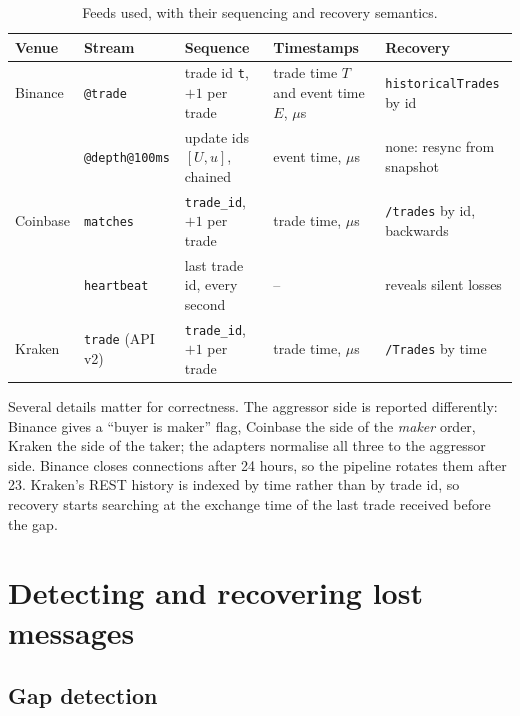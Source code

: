 \documentclass[11pt,a4paper]{article}
\newcommand{\code}[1]{\texttt{#1}}
\begin{document}
\begin{table}[ht]
\centering
\caption{Feeds used, with their sequencing and recovery semantics.}
\label{tab:venues}
\small
\begin{tabular}{@{}>{\raggedright\arraybackslash}p{1.5cm}>{\raggedright\arraybackslash}p{2.6cm}>{\raggedright\arraybackslash}p{3.3cm}>{\raggedright\arraybackslash}p{3.2cm}>{\raggedright\arraybackslash}p{3.0cm}@{}}
\toprule
Venue & Stream & Sequence & Timestamps & Recovery \\
\midrule
Binance & \code{@trade} & trade id \code{t}, $+1$ per trade & trade time $T$ and event time $E$, $\mu$s & \code{historicalTrades} by id \\
        & \code{@depth@100ms} & update ids $[U,u]$, chained & event time, $\mu$s & none: resync from snapshot \\
Coinbase & \code{matches} & \code{trade\_id}, $+1$ per trade & trade time, $\mu$s & \code{/trades} by id, backwards \\
         & \code{heartbeat} & last trade id, every second & -- & reveals silent losses \\
Kraken & \code{trade} (API v2) & \code{trade\_id}, $+1$ per trade & trade time, $\mu$s & \code{/Trades} by time \\
\bottomrule
\end{tabular}
\end{table}

Several details matter for correctness. The aggressor side is reported differently: Binance gives a
``buyer is maker'' flag, Coinbase the side of the \emph{maker} order, Kraken the side of the taker; the adapters
normalise all three to the aggressor side. Binance closes connections after 24 hours, so the pipeline rotates
them after 23. Kraken's REST history is indexed by time rather than by trade id, so recovery starts searching at
the exchange time of the last trade received before the gap.

\section{Detecting and recovering lost messages}\label{sec:losses}

\subsection{Gap detection}
\end{document}
